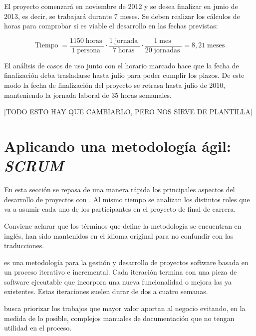 El proyecto comenzará en noviembre de 2012 y se desea finalizar en junio de 2013, es decir, se trabajará durante 7 meses. Se deben realizar los cálculos de horas para comprobar si es viable el desarrollo en las fechas previstas:
\newcommand{\tiempo}{\operatorname{Tiempo}}
\newcommand{\horas}{\operatorname{horas}}
\newcommand{\persona}{\operatorname{persona}}
\newcommand{\jornada}{\operatorname{jornada}}
\newcommand{\jornadas}{\operatorname{jornadas}}
\newcommand{\mes}{\operatorname{mes}}
\newcommand{\meses}{\operatorname{meses}}
\newcommand{\semana}{\operatorname{semana}}
\newcommand{\hora}{\operatorname{hora}}

\[
 \tiempo = \dfrac{1150 \horas}{1 \persona} \cdot \dfrac{1 \jornada}{7 \horas} \cdot \dfrac{1 \mes}{20 \jornadas} = 8,21 \meses
\]

El análisis de casos de uso junto con el horario marcado hace que la fecha de finalización deba trasladarse hasta julio para poder cumplir los plazos. De este modo la fecha de finalización del proyecto se retrasa hasta julio de 2010, manteniendo la jornada laboral de 35 horas semanales.

[TODO ESTO HAY QUE CAMBIARLO, PERO NOS SIRVE DE PLANTILLA]
\newpage


\section{Aplicando una metodología ágil: \textit{SCRUM}}
En esta sección se repasa de una manera rápida los principales aspectos del desarrollo de proyectos con \scrum{}. Al mismo tiempo se analizan los distintos roles que va a asumir cada uno de los participantes en el proyecto de final de carrera.

Conviene aclarar que los términos que define la metodología \scrum {} se encuentran en inglés, han sido mantenidos en el idioma original para no confundir con las traducciones.

\scrum{} \cite{scrum} es una metodología para la gestión y desarrollo de proyectos software basada en un proceso iterativo e incremental. Cada iteración termina con una pieza de software ejecutable que incorpora una nueva funcionalidad o mejora las ya existentes. Estas iteraciones suelen durar de dos a cuatro semanas.

\scrum{} busca priorizar los trabajos que mayor valor aportan al negocio evitando, en la medida de lo posible, complejos manuales de documentación que no tengan utilidad en el proceso.

